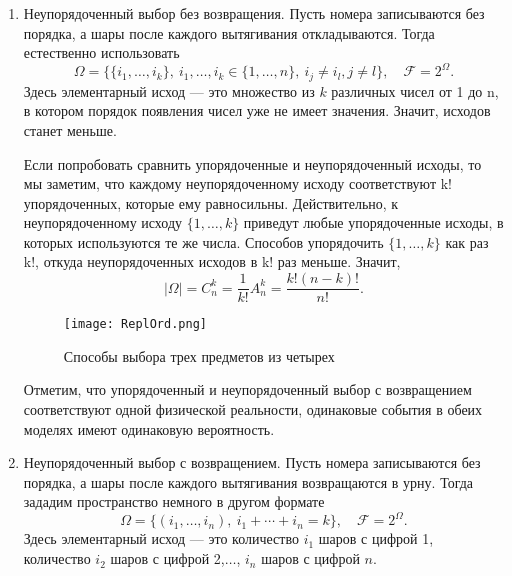 \documentclass[11 pt,russian]{article}
\begin{document}
\begin{enumerate}
Опять же удобно представить исходы в виде дерева, что легко позволяет убедиться в том, что $|\Omega| = n!/k! = A_n^k$.
\begin{figure}[h!]
\caption{Упорядоченный выбор без возвращения}
   \begin{center}
   \texttt{[image: Repl.png]}
   \end{center}
\end{figure}
\begin{Que}
А сколько способов достать пять шаров из семи, если шары не возвращаются в урну, а их порядок неважен?
\end{Que}
{\bf Как вы понимаете и в следующем не все хорошо}
\item Неупорядоченный выбор без возвращения. Пусть номера записываются без порядка, а шары после каждого вытягивания откладываются. Тогда естественно использовать
$$
\Omega = \{\{i_1,\dotsc,i_k\},\ i_1,\dotsc,i_k\in \{1,\dotsc,n\},\ i_j\neq i_l, j\neq l\},\quad \mathcal{F} = 2^{\Omega}.
$$
Здесь элементарный исход --- это множество из $k$ различных чисел от 1 до n, в котором порядок появления чисел уже не имеет значения. Значит, исходов станет меньше. 

Если попробовать сравнить упорядоченные и неупорядоченный исходы, то мы заметим, что каждому неупорядоченному исходу соответствуют k! упорядоченных, которые ему равносильны. Действительно, к неупорядоченному исходу $\{1,\dotsc,k\}$ приведут любые упорядоченные исходы, в которых используются те же числа. Способов упорядочить $\{1,\dotsc,k\}$ как раз k!, откуда неупорядоченных исходов в k! раз меньше. Значит,
$$
|\Omega| = C_n^k = \frac{1}{k!} A_n^k = \frac{k! (n-k)!}{n!}.
$$
\begin{figure}[h!]
\caption{Способы выбора трех предметов из четырех}
   \begin{center}
   \texttt{[image: ReplOrd.png]}
   \end{center}
\end{figure}
Отметим, что упорядоченный и неупорядоченный выбор с возвращением соответствуют одной физической реальности, одинаковые события в обеих моделях имеют одинаковую вероятность.
\item Неупорядоченный выбор с возвращением. Пусть номера записываются без порядка, а шары после каждого вытягивания возвращаются в урну. Тогда зададим пространство немного в другом формате
$$
\Omega = \{(i_1,\dotsc,i_n),\ i_1+\dotsb+i_n=k\},\quad \mathcal{F} = 2^{\Omega}.
$$
Здесь элементарный исход --- это количество $i_1$ шаров с цифрой 1, количество $i_2$ шаров с цифрой 2,$\dotsc$, $i_n$ шаров с цифрой $n$.  


\end{enumerate}
\end{document}
